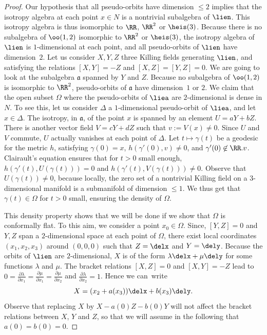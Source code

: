 \begin{proof}
Our hypothesis that all pseudo-orbits have dimension $\leq 2$ implies that the isotropy algebra at each point $x \in N$ is a nontrivial subalgebra of $\lien$. This isotropy algebra is thus isomorphic to $\RR$, $\RR^2$ or $\heis(3)$. Because there is no subalgebra of ${\oo}(1,2)$ isomorphic to $\RR^2$ or ${\heis}(3)$, the isotropy algebra of $\lien$ is $1$-dimensional at each point, and all pseudo-orbits of $\lien$ have dimension~$2$. Let us consider $X,Y,Z$ three Killing fields generating $\lien$, and satisfying the relations $[X,Y]=-Z$ and $[X,Z]=[Y,Z]=0$. We are going to look at the subalgebra ${\mathfrak a}$ spanned by $Y$ and $Z$. Because no subalgebra of ${\oo}(1,2)$ is isomorphic to $\RR^2$, pseudo-orbits of ${\mathfrak a}$ have dimension~$1$ or $2$. We claim that the open subset $\Omega$ where the pseudo-orbits of $\liea$ are $2$-dimensional is dense in $N$. To see this, let us consider $\Delta$ a $1$-dimensional pseudo-orbit of $\liea$, and let $x \in \Delta$. The isotropy, in ${\mathfrak a}$, of the point $x$ is spanned by an element $U=aY+bZ$. There is another vector field $V=cY+dZ$ such that $v:=V(x) \not =0$. Since $U$ and $V$ commute, $U$ actually vanishes at each point of $\Delta$. Let $t \mapsto \gamma(t)$ be a geodesic for the metric $h$, satisfying $\gamma(0)=x$, $h(\gamma'(0),v) \not =0$, and $\gamma'(0) \not \in \RR.v$. Clairault's equation ensures that for $t>0$ small enough, $h(\gamma'(t),U(\gamma(t)))=0$ and $h(\gamma'(t),V(\gamma(t))) \not =0$. Observe that $U(\gamma(t)) \not = 0$, because locally, the zero set of a nontrivial Killing field on a $3$-dimensional manifold is a submanifold of dimension $\leq 1$. We thus get that $\gamma(t) \in \Omega$ for $t>0$ small, ensuring the density of $\Omega$.

This density property shows that we will be done if we show that $\Omega$ is conformally flat. To this aim, we consider a point $x_0 \in \Omega$. Since, $[Y,Z]=0$ and $Y,Z$ span a $2$-dimensional space at each point of $\Omega$, there exist local coordinates $(x_1,x_2,x_3)$ around $(0,0,0)$ such that $Z=\delx$ and $Y=\dely$. Because the orbits of $\lien$ are $2$-dimensional, $X$ is of the form $\lambda \delx + \mu \dely$ for some functions $\lambda$ and $\mu$. The bracket relations $[X,Z]=0$ and $[X,Y]=-Z$ lead to $0=\frac{\partial \lambda}{\partial x_1}=\frac{\partial \mu}{\partial x_1}=\frac{\partial \mu}{\partial x_2}$ and $\frac{\partial \lambda}{\partial x_2}=1$. Hence we can~write
\[
X=(x_2+a(x_3))\delx + b(x_3)\dely.
\]
Observe that replacing $X$ by $X-a(0)Z-b(0)Y$ will not affect the bracket relations between $X$, $Y$ and $Z$, so that we will assume in the following that $a(0)=b(0)=0$.


\end{proof}
